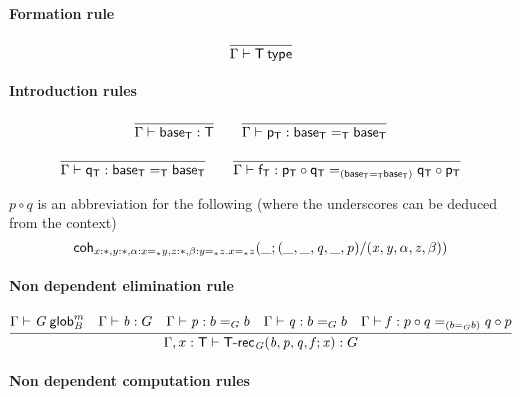 \paragraph{Formation rule}

\begin{small}
  \[
  \infer{\wftype\Gamma{\dsd{T}}}{}
  \]
\end{small}

\paragraph{Introduction rules}

\begin{small}
  \[
  \begin{array}{c}
    \infer{\ofglob{\Gamma}{\baseT}{\dsd{T}}}{}
    \qquad
    \infer{\ofglob{\Gamma}{\pT}{\homj{\dsd{T}}{\baseT}{\baseT}}}{}
    \\\\
    \infer{\ofglob{\Gamma}{\qT}{\homj{\dsd{T}}{\baseT}{\baseT}}}{}
    \qquad
    \infer{\ofglob{\Gamma}{\fT}{\homj{(\homj{\dsd{T}}{\baseT}{\baseT})}
        {\pT\circ\qT}{\qT\circ\pT}}}{}
  \end{array}
  \]
\end{small}

$p\circ q$ is an abbreviation for the following (where the underscores can be
deduced from the context)
\[\mathsf{coh}_{x:\mathord{*},y:\mathord{*},\alpha:x =_{\mathord{*}} y,z:\mathord{*},
  \beta:y =_{\mathord{*}} z.x =_{\mathord{*}} z} \mathit{(\_;(\_,\_,q,\_,p)/(x,y,\alpha,z,\beta))}\]

\paragraph{Non dependent elimination rule}

\begin{small}
  \[
  \infer{\ofglob{\Gamma,x:\dsd{T}}{\dsd{T\text{-}rec}_G(b, p, q, f; x)}{G}}
  {\wfglob{\Gamma}{G}{m}{B} & \ofglob{\Gamma}{b}{G} &
    \ofglob{\Gamma}{p}{\homj{G}{b}{b}} & \ofglob{\Gamma}{q}{\homj{G}{b}{b}} &
    \ofglob{\Gamma}{f}{\homj{(\homj{G}{b}{b})}{p\circ q}{q \circ p}}}
  \]
\end{small}

\paragraph{Non dependent computation rules}

